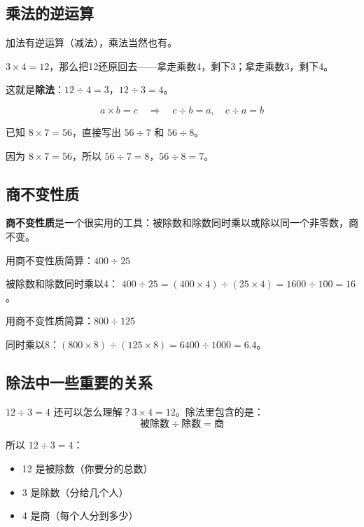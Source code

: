 
\subsection*{乘法的逆运算}

加法有逆运算（减法），乘法当然也有。

$3\times4=12$，那么把12还原回去——拿走乘数4，剩下3；拿走乘数3，剩下4。

这就是\textbf{除法}：$12\div4=3$，$12\div3=4$。

\[
a\times b = c \quad\Longrightarrow\quad c\div b = a,\quad c\div a = b
\]

\begin{example}
已知 $8\times7=56$，直接写出 $56\div7$ 和 $56\div8$。
\end{example}
\begin{solution}
因为 $8\times7=56$，所以 $56\div7=8$，$56\div8=7$。
\end{solution}

\subsection*{商不变性质}

\textbf{商不变性质}是一个很实用的工具：被除数和除数同时乘以或除以同一个非零数，商不变。

\begin{example}
用商不变性质简算：$400\div25$
\end{example}
\begin{solution}
被除数和除数同时乘以4：
$400\div25 = (400\times4)\div(25\times4) = 1600\div100 = 16$。
\end{solution}

\begin{example}
用商不变性质简算：$800\div125$
\end{example}
\begin{solution}
同时乘以8：$(800\times8)\div(125\times8) = 6400\div1000 = 6.4$。
\end{solution}

\subsection*{除法中一些重要的关系}

$12\div3=4$ 还可以怎么理解？$3\times4=12$。除法里包含的是：
\[
\text{被除数} \div \text{除数} = \text{商}
\]

所以 $12\div3=4$：
\begin{itemize}
  \item 12 是被除数（你要分的总数）
  \item 3 是除数（分给几个人）
  \item 4 是商（每个人分到多少）
\end{itemize}

